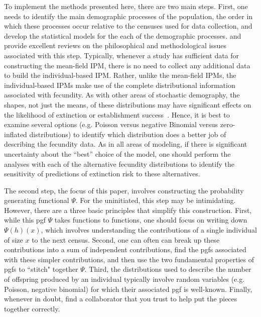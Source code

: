 \documentclass[12pt]{amsart}\usepackage[]{graphicx}\usepackage[]{color}
\begin{document}
To implement the methods presented here, there are two main steps. First, one needs to identify the main demographic processes of the population, the order in which these processes occur relative to the censuses used for data collection, and develop the statistical models for the each of the demographic processes. \citet{rees-etal-14} and \citet{merow-etal-14} provide excellent reviews on the philosophical and methodological issues associated with this step. Typically, whenever a study has sufficient data for constructing the mean-field IPM, there is no need to collect any additional data to build the individual-based IPM.  Rather, unlike the mean-field IPMs, the individual-based IPMs make use of the complete distributional information associated with fecundity. As with other areas of stochastic demography, the shapes, not just the means, of these distributions may have significant effects on the likelihood of extinction or establishment success~\citep{nature-05}. Hence, it is best to examine several options (e.g. Poisson versus negative Binomial versus zero-inflated distributions) to identify which distribution does a better job of describing the fecundity data. As in all areas of modeling, if there is significant uncertainty about the ``best'' choice of the model, one should perform the analyses with each of the alternative fecundity distributions to identify the sensitivity of predictions of extinction risk to these alternatives.

The second step, the focus of this paper, involves constructing the probability generating functional $\Psi$. For the uninitiated, this step may be intimidating. However, there are a three basic principles that simplify this construction. First, while this pgf $\Psi$ takes functions to functions, one should focus on writing down $\Psi(h)(x)$, which involves understanding the contributions of a single individual of size $x$ to the next census. Second, one can often can break up these contributions into a sum of independent contributions, find the pgfs associated with these simpler contributions, and then use the two fundamental properties of pgfs to ``stitch" together $\Psi$. Third, the distributions used to describe the number of offspring produced by an individual typically involve random variables (e.g. Poisson, negative binomial) for which their associated pgf is well-known. Finally, whenever in doubt, find a collaborator that you trust to help put the pieces together correctly.
\end{document}
